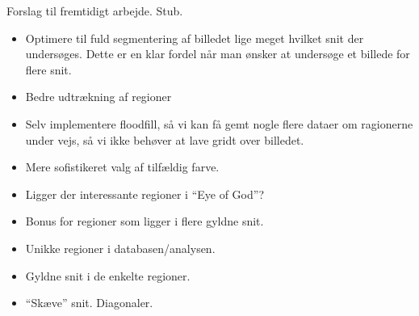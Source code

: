 {
{\sffamily Forslag til fremtidigt arbejde. Stub.
}

\begin{itemize}
    \item Optimere til fuld segmentering af billedet lige meget hvilket
        snit der undersøges. Dette er en klar fordel når man ønsker at
        undersøge et billede for flere snit.
    \item Bedre udtrækning af regioner
    \item Selv implementere floodfill, så vi kan få gemt nogle flere
    dataer om ragionerne under vejs, så vi ikke behøver at lave gridt
    over billedet.
    \item Mere sofistikeret valg af tilfældig farve.
    \item Ligger der interessante regioner i ``Eye of God''?
    \item Bonus for regioner som ligger i flere gyldne snit.
    \item Unikke regioner i databasen/analysen.
    \item Gyldne snit i de enkelte regioner.
    \item ``Skæve'' snit. Diagonaler.
\end{itemize}

%
}

